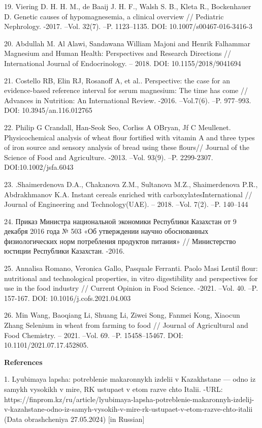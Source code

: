 19. Viering D. H. H. M., de Baaij J. H. F., Walsh S. B., Kleta R.,
Bockenhauer D. Genetic causes of hypomagnesemia, a clinical overview //
Pediatric Nephrology. -2017. --Vol. 32(7). --P. 1123--1135. DOI:
10.1007/s00467-016-3416-3

20. Abdullah M. Al Alawi, Sandawana William Majoni and Henrik Falhammar
Magnesium and Human Health: Perspectives and Research Directions //
International Journal of Endocrinology. -- 2018. DOI:
10.1155/2018/9041694

21. Costello RB, Elin RJ, Rosanoff A, et al.. Perspective: the case for
an evidence-based reference interval for serum magnesium: The time has
come // Advances in Nutrition: An International Review. -2016.
--Vol.7(6). --P. 977--993. DOI: 10.3945/an.116.012765

22. Philip G Crandall, Han-Seok Seo, Corliss A O\textquotesingle Bryan,
Jf C Meullenet. Physicochemical analysis of wheat flour fortified with
vitamin A and three types of iron source and sensory analysis of bread
using these flours// Journal of the Science of Food and Agriculture.
-2013. --Vol. 93(9). --P. 2299-2307. DOI:10.1002/jsfa.6043

23. .Shaimerdenova D.A., Chakanova Z.M., Sultanova M.Z., Shaimerdenova
P.R., Abdrakhmanov K.A. Instant cereals enriched with
carboxylatesInternational // Journal of Engineering and Technology(UAE).
-- 2018. --Vol. 7(2). --P. 140--144

24. Приказ Министра национальной экономики Республики Казахстан от 9
декабря 2016 года № 503 «Об утверждении научно обоснованных
физиологических норм потребления продуктов питания» // Министерство
юстиции Республики Казахстан. -2016.

25. Annalisa Romano, Veronica Gallo, Pasquale Ferranti. Paolo Masi
Lentil flour: nutritional and technological properties, in vitro
digestibility and perspectives for use in the food industry // Current
Opinion in Food Science. -2021. --Vol. 40. --P. 157-167. DOI:
10.1016/j.cofs.2021.04.003

26. Min Wang, Baoqiang Li, Shuang Li, Ziwei Song, Fanmei Kong, Xiaocun
Zhang Selenium in wheat from farming to food // Journal of Agricultural
and Food Chemistry. -- 2021. --Vol. 69. --P. 15458--15467. DOI:
10.1101/2021.07.17.452805.

{\bfseries References}

1. Lyubimaya lapsha: potreblenie makaronnykh izdelii v Kazakhstane ---
odno iz samykh vysokikh v mire, RK ustupaet v etom razve chto Italii.
-URL:
https://finprom.kz/ru/article/lyubimaya-lapsha-potreblenie-makaronnyh-izdelij-v-kazahstane-odno-iz-samyh-vysokih-v-mire-rk-ustupaet-v-etom-razve-chto-italii
(Data obrashcheniya 27.05.2024) {[}in Russian{]}

